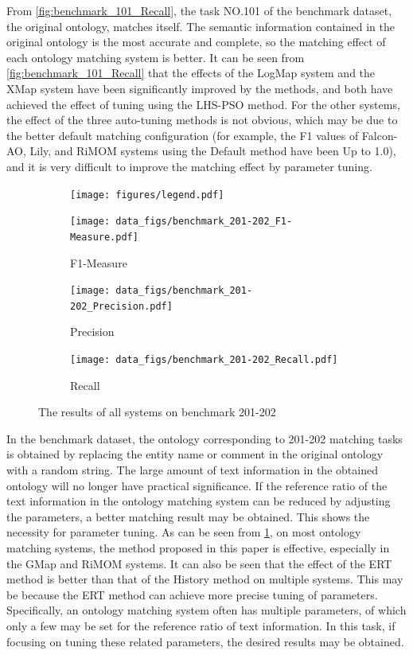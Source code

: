 \documentclass[twoside]{article}
\begin{document}
From \ref{fig:benchmark_101_Recall}, the task NO.101 of the benchmark dataset, the original ontology, matches itself.
The semantic information contained in the original ontology is the most accurate and complete, so the matching effect of each ontology matching system is better.
It can be seen from \ref{fig:benchmark_101_Recall} that the effects of the LogMap system and the XMap system have been significantly improved by the methods, and both have achieved the effect of tuning using the LHS-PSO method.
For the other systems, the effect of the three auto-tuning methods is not obvious, which may be due to the better default matching configuration (for example, the F1 values of Falcon-AO, Lily, and RiMOM systems using the Default method have been Up to 1.0), and it is very difficult to improve the matching effect by parameter tuning.
\begin{figure}[htb!]\centering
\begin{subfigure}{\textwidth}
	\centering
\texttt{[image: figures/legend.pdf]}
\end{subfigure}
\begin{subfigure}{0.3\textwidth}
	\centering
\texttt{[image: data\_figs/benchmark\_201-202\_F1-Measure.pdf]}
\caption{F1-Measure}
\label{fig:benchmark_201-202_F1-Measure}
\end{subfigure}
\begin{subfigure}{0.3\textwidth}
	\centering
\texttt{[image: data\_figs/benchmark\_201-202\_Precision.pdf]}
\caption{Precision}
\label{fig:benchmark_201-202_Precision}
\end{subfigure}
\begin{subfigure}{0.3\textwidth}
	\centering
\texttt{[image: data\_figs/benchmark\_201-202\_Recall.pdf]}
\caption{Recall}
\label{fig:benchmark_201-202_Recall}
\end{subfigure}
\caption{The results of all systems on benchmark 201-202}
\end{figure}


In the benchmark dataset, the ontology corresponding to 201-202 matching tasks is obtained by replacing the entity name or comment in the original ontology with a random string. The large amount of text information in the obtained ontology will no longer have practical significance.
If the reference ratio of the text information in the ontology matching system can be reduced by adjusting the parameters, a better matching result may be obtained.
This shows the necessity for parameter tuning.
As can be seen from \ref{fig:benchmark_201-202_F1-Measure}, on most ontology matching systems, the method proposed in this paper is effective, especially in the GMap and RiMOM systems.
It can also be seen that the effect of the ERT method is better than that of the History method on multiple systems. This may be because the ERT method can achieve more precise tuning of parameters.
Specifically, an ontology matching system often has multiple parameters, of which only a few may be set for the reference ratio of text information.
In this task, if focusing on tuning these related parameters, the desired results may be obtained.
\end{document}
